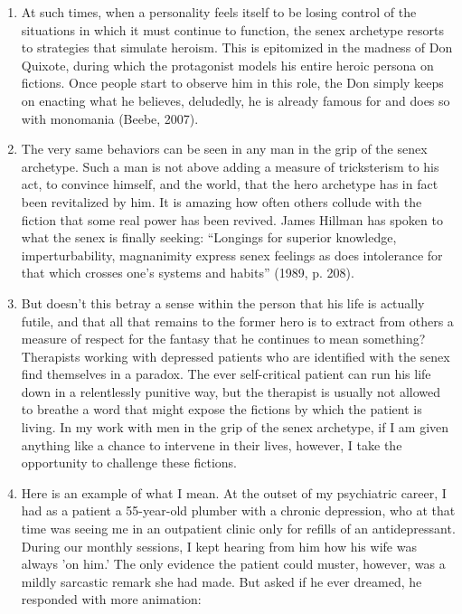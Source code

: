\begin{enumerate}
\item {} At such times, when a personality
feels itself to be losing control of the situations in which it must continue
to function, the senex archetype resorts to strategies that simulate heroism.
This is epitomized in the madness of Don Quixote, during which the protagonist
models his entire heroic persona on fictions. Once people start to observe him
in this role, the Don simply keeps on enacting what he believes, deludedly, he
is already famous for and does so with monomania (Beebe, 2007).

\item {} The very same
behaviors can be seen in any man in the grip of the senex archetype. Such a man
is not above adding a measure of tricksterism to his act, to convince himself,
and the world, that the hero archetype has in fact been revitalized by him. It
is amazing how often others collude with the fiction that some real power has
been revived. James Hillman has spoken to what the senex is finally seeking:
``Longings for superior knowledge, imperturbability, magnanimity express senex
feelings as does intolerance for that which crosses one's systems and habits''
(1989, p. 208).

\item {} But doesn't this betray a sense within
the person that his life is actually futile, and that all that remains to the
former hero is to extract from others a measure of respect for the fantasy that
he continues to mean something? Therapists working with depressed patients who
are identified with the senex find themselves in a paradox. The ever
self-critical patient can run his life down in a relentlessly punitive way, but
the therapist is usually not allowed to breathe a word that might expose the
fictions by which the patient is living. In my work with men in the grip of the
senex archetype, if I am given anything like a chance to intervene in their
lives, however, I take the opportunity to challenge these fictions.

\item {} Here is an example
of what I mean. At the outset of my psychiatric career, I had as a patient a
55-year-old plumber with a chronic depression, who at that time was seeing me
in an outpatient clinic only for refills of an antidepressant. During our
monthly sessions, I kept hearing from him how his wife was always 'on him.' The
only evidence the patient could muster, however, was a mildly sarcastic remark
she had made. But asked if he ever dreamed, he responded with more animation:


\end{enumerate}
